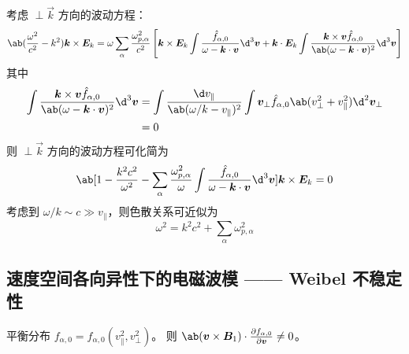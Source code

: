 考虑 $\perp\vec{k}$ 方向的波动方程：
\begin{equation}\begin{aligned}
\ab(\frac{\omega^2}{c^2} - k^2) \vec{k}\times\vec{E}_k
= \omega \sum_\alpha \frac{\omega_{p,\alpha}^2}{c^2}
\left[
\vec{k}\times\vec{E}_k \int
\frac{\hat{f}_{\alpha,0}}{\omega - \vec{k}\cdot\vec{v}}
\d^3\vec{v}
+ \vec{k} \cdot \vec{E}_k \int
\frac{\vec{k}\times\vec{v} \hat{f}_{\alpha,0}}
{\ab(\omega - \vec{k}\cdot\vec{v})^2}
\d^3\vec{v}
\right]
\end{aligned}\end{equation}
其中
\begin{equation}\begin{aligned}
\int
\frac{\vec{k}\times\vec{v} \hat{f}_{\alpha,0}}
{\ab(\omega - \vec{k}\cdot\vec{v})^2}
\d^3\vec{v}
&= \int
\frac{\d v_\parallel}{\ab(\omega/k - v_\parallel)^2}
\int \vec{v}_\perp \hat{f}_{\alpha,0}\ab(v_\perp^2 + v_\parallel^2)
\d^2\vec{v}_\perp \\
&= 0
\end{aligned}\end{equation}
则 $\perp\vec{k}$ 方向的波动方程可化简为
\begin{equation}
\ab[
    1 - \frac{k^2 c^2}{\omega^2}
    - \sum_\alpha \frac{\omega_{p,\alpha}^2}{\omega}
    \int
    \frac{\hat{f}_{\alpha,0}}{\omega - \vec{k}\cdot\vec{v}}
    \d^3\vec{v}
]
\vec{k}\times\vec{E}_k = 0
\end{equation}
考虑到 $\omega/k \sim c \gg v_\parallel$，则色散关系可近似为
\begin{equation}
\omega^2 = k^2 c^2 + \sum_\alpha \omega_{p,\alpha}^2
\end{equation}

\subsection{速度空间各向异性下的电磁波模 —— Weibel 不稳定性}

平衡分布 $f_{\alpha,0} = f_{\alpha,0}(v_\parallel^2, v_\perp^2)$。
则 $\ab(\vec{v}\times\vec{B}_1)\cdot\pdv{f_{\alpha,0}}{\vec{v}}\neq0$。


